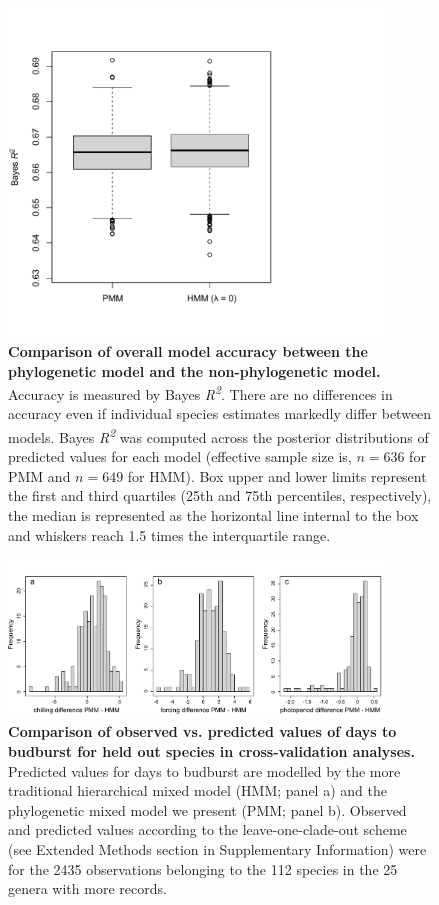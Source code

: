 \documentclass{article}
\begin{document}
\begin{figure}
  \centering
\noindent \includegraphics[width=0.9\textwidth]{../../analyses/phylogeny/figures/Boxplot_bayesR2.pdf}
  \caption{\textbf{Comparison of overall model accuracy between the phylogenetic model and the non-phylogenetic model.} Accuracy is measured by Bayes \emph{R\textsuperscript{2}}. There are no differences in accuracy even if individual species estimates markedly differ between models. Bayes \emph{R\textsuperscript{2}} was computed across the posterior distributions of predicted values for each model (effective sample size is, $n = 636$ for PMM and $n = 649$ for HMM). Box upper and lower limits represent the first and third quartiles (25th and 75th percentiles, respectively), the median is represented as the horizontal line internal to the box and whiskers reach 1.5 times the interquartile range.}
  \label{fig:accuracycomp}
\end{figure}
\clearpage

\begin{figure}
  \centering
\noindent \includegraphics[width=0.9\textwidth]{../../analyses/phylogeny/figures/FigSXX_bias_sens_phylo_nonphylo.pdf}
  \caption{\textbf{Comparison of observed vs. predicted values of days to budburst for held out species in cross-validation analyses.} Predicted values for days to budburst are modelled by the more traditional hierarchical mixed model (HMM; panel a) and the phylogenetic mixed model we present (PMM; panel b). Observed and predicted values according to the leave-one-clade-out scheme (see Extended Methods section in Supplementary Information) were for the 2435 observations belonging to the 112 species in the 25 genera with more records.}
  \label{fig:biasestimation}
\end{figure}
\clearpage
\end{document}
